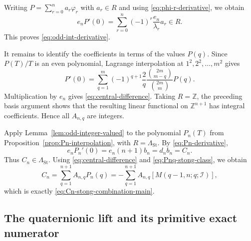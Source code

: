 \documentclass[14pt,dvipsnames]{extarticle}
\makeatletter
\numberwithin{equation}{subsection}
\theoremstyle{plain}
\theoremstyle{definition}
\theoremstyle{definition}
\renewenvironment{proof}[1][\proofname]{
 \par\pushQED{\qed}\normalfont
 \topsep6\p@\@plus6\p@\relax
 \trivlist\item[\hskip\labelsep\bfseries\itshape #1\@addpunct{.}]
}{\popQED\endtrivlist\@endpefalse}
\let\phi\varphi
\newcommand{\Ii}{\mathcal I}
\newcommand{\LambdaSt}{\Lambda_{\mathrm{St}}}
\makeatother
\begin{document}
\begin{proof}
Writing $P=\sum_{r=0}^{n}a_r\phi_r$ with $a_r\in R$ and using
\eqref{eq:phi-r-derivative}, we obtain
\[
 e_nP'(0)
 =\sum_{r=0}^{n}
  (-1)^r\frac{e_n}{\lambda_r}a_r\in R.
\]
This proves \eqref{eq:odd-int-derivative}.

It remains to identify the coefficients in terms of the values $P(q)$. Since
$P(T)/T$ is an even polynomial, Lagrange interpolation at
$1^2,2^2,\ldots,m^2$ gives
\[
 P'(0)
 =\sum_{q=1}^{m}
  (-1)^{q+1}\frac{2}{q}
  \frac{\binom{2m}{m-q}}{\binom{2m}{m}}P(q).
\]
Multiplication by $e_n$ gives \eqref{eq:central-difference}. Taking $R=\mathbb Z$,
the preceding basis argument shows that the resulting linear functional on $\mathbb Z^{n+1}$ has
integral coefficients. Hence all $A_{n,q}$ are integers.
\end{proof}

\begin{proof}[Proof of \cref{thm:stong-numerators}]
Apply Lemma~\ref{lem:odd-integer-valued} to the polynomial $P_n(T)$ from
Proposition~\ref{prop:Pn-interpolation}, with $R=\LambdaSt$. By
\eqref{eq:Pn-derivative},
\[
 e_nP_n'(0)
 =e_n(n+1)b_n
 =d_nb_n
 =C_n.
\]
Thus $C_n\in\LambdaSt$. Using \eqref{eq:central-difference} and
\eqref{eq:Pnq-stong-class}, we obtain
\[
 C_n
 =\sum_{q=1}^{n+1}A_{n,q}P_n(q)
 =-\sum_{q=1}^{n+1}A_{n,q}[M(q-1,n;q;\Ii)],
\]
which is exactly \eqref{eq:Cn-stong-combination-main}.
\end{proof}

\subsection{The quaternionic lift and its primitive exact numerator}
\label{sec:sp-lift}
\end{document}
